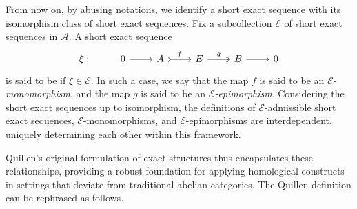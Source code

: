 From now on, by abusing notations, we identify a short exact sequence with its isomorphism class of short exact sequences. Fix a subcollection $\mathcal{E}$ of short exact sequences in $\mathscr{A}$. A short exact sequence \[\begin{tikzcd}
	\xi: & 0 & A & E & B &  0
	\arrow[from=1-2, to=1-3]
	\arrow["f",tail, from=1-3, to=1-4]
	\arrow["g",two heads,from=1-4, to=1-5]
	\arrow[from=1-5, to=1-6]
\end{tikzcd} \] is said to be  if $\xi \in \mathcal{E}$. In such a case, we say that the map $f$ is said to be an \emph{$\mathcal{E}$-monomorphism}, and the map $g$ is said to be an \emph{$\mathcal{E}$-epimorphism}. Considering the short exact sequences up to isomorphism, the definitions of $\mathcal{E}$-admissible short exact sequences, $\mathcal{E}$-monomorphisms, and $\mathcal{E}$-epimorphisms are interdependent, uniquely determining each other within this framework.

Quillen’s original formulation of exact structures thus encapsulates these relationships, providing a robust foundation for applying homological constructs in settings that deviate from traditional abelian categories. The Quillen definition can be rephrased as follows.


